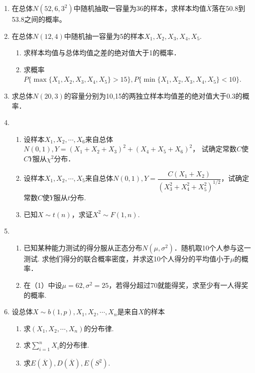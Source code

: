 \documentclass[10pt,a4paper]{article}
\begin{document}
\begin{enumerate}



    \item 在总体$N(52,6,3^2)$中随机抽取一容量为36的样本，求样本均值$\overline{X}$落在50.8到53.8之间的概率。
        


    \item  在总体$N(12,4)$中随机抽一容量为5的样本$X_1,X_2,X_3,X_4,X_5$.
    \begin{enumerate}
        \item 求样本均值与总体均值之差的绝对值大于1的概率．
        \item 求概率$P\{\max\{X_1,X_2,X_3,X_4,X_5\}>15\},P\{\min \{X_1,X_2,X_3,X_4,X_5\}<10\}$.
    \end{enumerate}


    \item 求总体$N(20,3)$的容量分别为10,15的两独立样本均值差的绝对值大于0.3的概率．
    

    \item \begin{enumerate}
        \item 设样本$X_1,X_2,\cdots,X_6$来自总体$N(0,1),Y=(X_1+X_2+X_3)^2+(X_4+X_5+X_6)^2$，
        试确定常数$C$使$CY$服从$\chi ^2$分布．
        \item 设样本$X_1,X_2,\cdots,X_5$来自总体$N(0,1),Y=\dfrac{C(X_1+X_2)}{(X_3^2+X_4^2+X_5^2)^{1/2}}$，试确定
        常数$C$使$Y$服从$t$分布.
        \item 已知$X\sim t(n)$，求证$X^2\sim F(1,n)$.
    \end{enumerate}



    \item \begin{enumerate}
        \item 已知某种能力测试的得分服从正态分布$N(\mu,\sigma^2)$．随机取10个人参与这一测试.
        求他们得分的联合概率密度，并求这10个人得分的平均值小于$\mu$的概率．
        \item 在（1）中设$\mu=62,\sigma^2=25$，若得分超过70就能得奖，求至少有一人得奖的概率.
    \end{enumerate}


    \item 设总体$X\sim b(1,p),X_1,X_2,\cdots,X_n$是来自$X$的样本
    \begin{enumerate}
        \item 求$(X_1,X_2,\cdots,X_n)$的分布律.
        \item 求$\displaystyle{\sum_{i=1}^n X_i}$的分布律.
        \item 求$E(\overline{X}),D(\overline{X}),E(S^2)$.
    \end{enumerate}



\end{enumerate}
\end{document}
